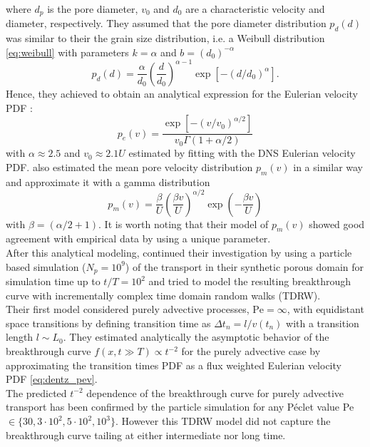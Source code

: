 where $d_p$ is the pore diameter, $v_0$ and $d_0$ are a characteristic velocity and diameter, respectively.
They assumed that the pore diameter distribution $p_d(d)$ was similar to their the grain size distribution, i.e. a Weibull distribution \eqref{eq:weibull} with parameters $k=\alpha$ and $b=(d_0)^{-\alpha}$
\[
p_d(d)=\frac{\alpha}{d_0}\left(\frac{d}{d_0}\right)^{\alpha-1}\exp[-(d/d_0)^\alpha].
\]
Hence, they achieved to obtain an analytical expression for the Eulerian velocity PDF :
\begin{equation}\label{eq:dentz_pev}
p_e(v)=\frac{\exp[-(v/v_0)^{\alpha/2}]}{v_0\Gamma(1+\alpha/2)}
\end{equation}
with $\alpha\approx2.5$ and $v_0\approx2.1U$ estimated by fitting with the DNS Eulerian velocity PDF.
\citeauthor{Dentz2017} also estimated the mean pore velocity distribution $p_m(v)$ in a similar way and approximate it with a gamma distribution
\begin{equation}\label{eq:dentz_pmv}
p_m(v)=\frac{\beta}{U}\left(\frac{\beta v}{U}\right)^{\alpha/2}\exp\left(-\frac{\beta v}{U}\right) 
\end{equation}
with $\beta=(\alpha/2+1)$. 
It is worth noting that their model of $p_m(v)$ showed good agreement with empirical data by using a unique parameter.\\
After this analytical modeling, \citeauthor{Dentz2017} continued their investigation by using a particle based simulation ($N_p=10^9$) of the transport in their synthetic porous domain for simulation time up to $t/T=10^2$ and tried to model the resulting breakthrough curve with incrementally complex time domain random walks (TDRW).\\
Their first model considered purely advective processes, $\mathrm{Pe}=\infty$, with equidistant space transitions by defining transition time as $\Delta t_n=l/v(t_n)$ with a transition length  $l\sim L_0$. 
They estimated analytically the asymptotic behavior of the breakthrough curve $f(x,t\gg T)\propto t^{-2}$ for the purely advective case by approximating the transition times PDF as a flux weighted Eulerian velocity PDF \eqref{eq:dentz_pev}.\\
The predicted $t^{-2}$ dependence of the breakthrough curve for purely advective transport has been confirmed by the particle simulation for any Péclet value Pe$\in\{30, 3\cdot10^2, 5\cdot10^2, 10^3\}$. However this TDRW model did not capture the breakthrough curve tailing at either intermediate nor long time.\\
